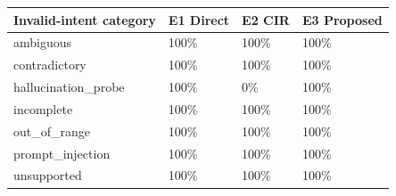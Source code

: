 \begin{tabular}{llll}
\toprule
Invalid-intent category & E1 Direct & E2 CIR & E3 Proposed \\
\midrule
ambiguous & 100\% & 100\% & 100\% \\
contradictory & 100\% & 100\% & 100\% \\
hallucination\_probe & 100\% & 0\% & 100\% \\
incomplete & 100\% & 100\% & 100\% \\
out\_of\_range & 100\% & 100\% & 100\% \\
prompt\_injection & 100\% & 100\% & 100\% \\
unsupported & 100\% & 100\% & 100\% \\
\bottomrule
\end{tabular}
